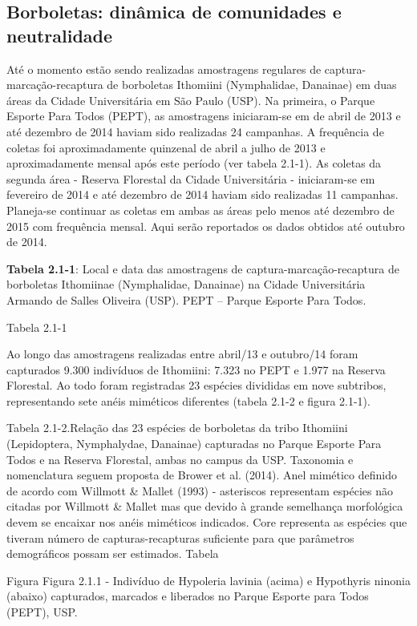 \subsection{Borboletas: dinâmica de comunidades e neutralidade} %
\label{sec:dinamica-temporal-borb} 
Até o momento estão sendo realizadas amostragens regulares de captura-marcação-recaptura de borboletas Ithomiini (Nymphalidae, Danainae) em duas áreas da Cidade Universitária em São Paulo (USP). Na primeira, o Parque Esporte Para Todos (PEPT), as amostragens iniciaram-se em de abril de 2013 e até dezembro de 2014 haviam sido realizadas 24 campanhas. A frequência de coletas foi aproximadamente quinzenal de abril a julho de 2013 e aproximadamente mensal após este período (ver tabela 2.1-1). As coletas da segunda área - Reserva Florestal da Cidade Universitária - iniciaram-se em fevereiro de 2014 e até dezembro de 2014 haviam sido realizadas 11 campanhas. Planeja-se continuar as coletas em ambas as áreas pelo menos até dezembro de 2015 com frequência mensal. Aqui serão reportados os dados obtidos até outubro de 2014.

\textbf{Tabela 2.1-1}: Local e data das amostragens de captura-marcação-recaptura de borboletas Ithomiinae (Nymphalidae, Danainae) na Cidade Universitária Armando de Salles Oliveira (USP). PEPT – Parque Esporte Para Todos.

Tabela 2.1-1

Ao longo das amostragens realizadas entre abril/13 e outubro/14 foram capturados 9.300 indivíduos de Ithomiini: 7.323 no PEPT e 1.977 na Reserva Florestal. Ao todo foram registradas 23 espécies divididas em nove subtribos, representando sete anéis miméticos diferentes (tabela 2.1-2 e figura 2.1-1). 

Tabela 2.1-2.Relação das 23 espécies de borboletas da tribo Ithomiini (Lepidoptera, Nymphalydae, Danainae) capturadas no Parque Esporte Para Todos e na Reserva Florestal, ambas no campus da USP. Taxonomia e nomenclatura seguem proposta de Brower et al. (2014). Anel mimético definido de acordo com Willmott & Mallet (1993) - asteriscos representam espécies não citadas por Willmott & Mallet mas que devido à grande semelhança morfológica devem se encaixar nos anéis miméticos indicados. Core representa as espécies que tiveram número de capturas-recapturas suficiente para que parâmetros demográficos possam ser estimados.
Tabela

Figura
Figura 2.1.1 - Indivíduo de Hypoleria lavinia (acima) e Hypothyris ninonia (abaixo) capturados, marcados e liberados no Parque Esporte para Todos (PEPT), USP.

